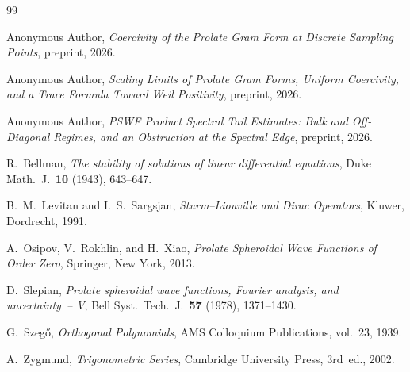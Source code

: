 \documentclass[12pt,a4paper]{amsart}
\begin{document}
\begin{thebibliography}{99}

Anonymous Author,
\emph{Coercivity of the Prolate Gram Form at Discrete
Sampling Points}, preprint, 2026.

Anonymous Author,
\emph{Scaling Limits of Prolate Gram Forms, Uniform
Coercivity, and a Trace Formula Toward Weil Positivity},
preprint, 2026.

Anonymous Author,
\emph{PSWF Product Spectral Tail Estimates: Bulk and
Off-Diagonal Regimes, and an Obstruction at the
Spectral Edge}, preprint, 2026.

R.~Bellman,
\textit{The stability of solutions of linear differential
equations},
Duke Math.\ J.\ \textbf{10} (1943), 643--647.

B.~M.~Levitan and I.~S.~Sargsjan,
\textit{Sturm--Liouville and Dirac Operators},
Kluwer, Dordrecht, 1991.

A.~Osipov, V.~Rokhlin, and H.~Xiao,
\textit{Prolate Spheroidal Wave Functions of Order Zero},
Springer, New York, 2013.

D.~Slepian,
\textit{Prolate spheroidal wave functions, Fourier
analysis, and uncertainty~-- V},
Bell Syst.\ Tech.\ J.\ \textbf{57} (1978), 1371--1430.

G.~Szeg\H{o},
\textit{Orthogonal Polynomials},
AMS Colloquium Publications, vol.~23, 1939.

A.~Zygmund,
\textit{Trigonometric Series},
Cambridge University Press, 3rd~ed., 2002.

\end{thebibliography}
\end{document}
